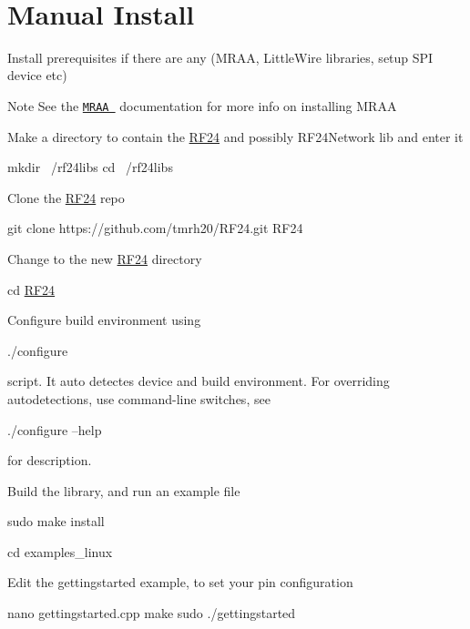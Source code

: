 ~\newline
 \hypertarget{Linux_ManInstall}{}\section{Manual Install}\label{Linux_ManInstall}

\begin{DoxyEnumerate}
\item Install prerequisites if there are any (M\+R\+AA, Little\+Wire libraries, setup S\+PI device etc) \begin{DoxyNote}{Note}
See the \href{http://iotdk.intel.com/docs/master/mraa/index.html}{\tt M\+R\+AA } documentation for more info on installing M\+R\+AA ~\newline

\end{DoxyNote}

\item Make a directory to contain the \hyperlink{classRF24}{R\+F24} and possibly R\+F24\+Network lib and enter it 
\begin{DoxyCode}
mkdir ~/rf24libs 
cd ~/rf24libs
\end{DoxyCode}

\item Clone the \hyperlink{classRF24}{R\+F24} repo 
\begin{DoxyCode}
git clone https:\textcolor{comment}{//github.com/tmrh20/RF24.git RF24 }
\end{DoxyCode}

\item Change to the new \hyperlink{classRF24}{R\+F24} directory 
\begin{DoxyCode}
cd \hyperlink{classRF24}{RF24} 
\end{DoxyCode}

\item Configure build environment using
\begin{DoxyCode}
./configure 
\end{DoxyCode}
 script. It auto detectes device and build environment. For overriding autodetections, use command-\/line switches, see
\begin{DoxyCode}
./configure --help 
\end{DoxyCode}
 for description.
\item Build the library, and run an example file 
\begin{DoxyCode}
sudo make install 
\end{DoxyCode}
 
\begin{DoxyCode}
cd examples\_linux  
\end{DoxyCode}
 Edit the gettingstarted example, to set your pin configuration 
\begin{DoxyCode}
nano gettingstarted.cpp 
make 
sudo ./gettingstarted
\end{DoxyCode}

\end{DoxyEnumerate}

~\newline
~\newline
 